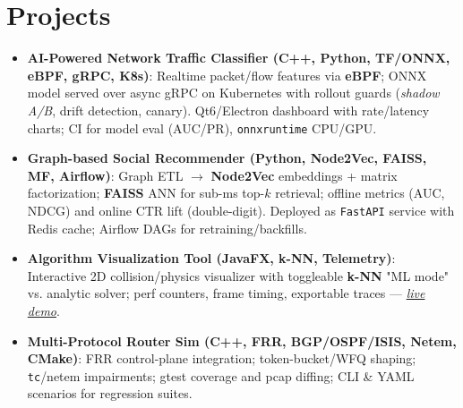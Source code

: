 \documentclass[letterpaper,11pt]{article}
\newcommand{\resumeItem}[2]{\item\small{\textbf{#1}{: }#2}}
\newcommand{\resumeSubItem}[2]{\resumeItem{#1}{#2}\vspace{-2pt}}
\newcommand{\resumeSubHeadingListStart}{\begin{itemize}[leftmargin=*, itemsep=1pt, topsep=2pt]}
\newcommand{\resumeSubHeadingListEnd}{\end{itemize}}
\begin{document}
\section{Projects}
  \resumeSubHeadingListStart
    \resumeSubItem{AI-Powered Network Traffic Classifier \textnormal{(C++, Python, TF/ONNX, eBPF, gRPC, K8s)}}
      {Realtime packet/flow features via \textbf{eBPF}; ONNX model served over async gRPC on Kubernetes with rollout guards (\textit{shadow A/B}, drift detection, canary). Qt6/Electron dashboard with rate/latency charts; CI for model eval (AUC/PR), \texttt{onnxruntime} CPU/GPU.}
    \resumeSubItem{Graph-based Social Recommender \textnormal{(Python, Node2Vec, FAISS, MF, Airflow)}}
      {Graph ETL \(\rightarrow\) \textbf{Node2Vec} embeddings + matrix factorization; \textbf{FAISS} ANN for sub-ms top-$k$ retrieval; offline metrics (AUC, NDCG) and online CTR lift (double-digit). Deployed as \texttt{FastAPI} service with Redis cache; Airflow DAGs for retraining/backfills.}
    \resumeSubItem{Algorithm Visualization Tool \textnormal{(JavaFX, k-NN, Telemetry)}}
      {Interactive 2D collision/physics visualizer with toggleable \textbf{k-NN} "ML mode" vs. analytic solver; perf counters, frame timing, exportable traces — \href{https://ljluestc.github.io/visualgo/demo.html}{\textit{live demo}}.}
    \resumeSubItem{Multi-Protocol Router Sim \textnormal{(C++, FRR, BGP/OSPF/ISIS, Netem, CMake)}}
      {FRR control-plane integration; token-bucket/WFQ shaping; \texttt{tc}/netem impairments; gtest coverage and pcap diffing; CLI \& YAML scenarios for regression suites.}
  \resumeSubHeadingListEnd
\end{document}
